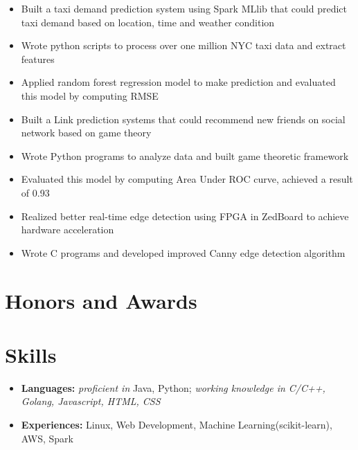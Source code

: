 \documentclass{resume}
\begin{document}

\begin{itemize}
  \item Built a taxi demand prediction system using Spark MLlib that could predict taxi demand based on location, time and weather condition
  \item Wrote python scripts to process over one million NYC taxi data and extract features
  \item Applied random forest regression model to make prediction and evaluated this model by computing RMSE
\end{itemize}

\begin{itemize}
    \item Built a Link prediction systems that could recommend new friends on social network based on game theory
    \item Wrote Python programs to analyze data and built game theoretic framework
    \item Evaluated this model by computing Area Under ROC curve, achieved a result of 0.93
\end{itemize}

\begin{itemize}
    \item Realized better real-time edge detection using FPGA in ZedBoard to achieve hardware acceleration
    \item Wrote C programs and developed improved  Canny edge detection algorithm
\end{itemize}

\section{Honors and Awards}


\section{Skills}
\begin{itemize}[parsep=0.5ex]
  \item \textbf{Languages: }\textit{proficient in }Java, Python; \textit{working knowledge in C/C++, Golang, Javascript, HTML, CSS} 
  \item \textbf{Experiences: }Linux, Web Development, Machine Learning(scikit-learn), AWS, Spark
\end{itemize}




%
%
\end{document}
